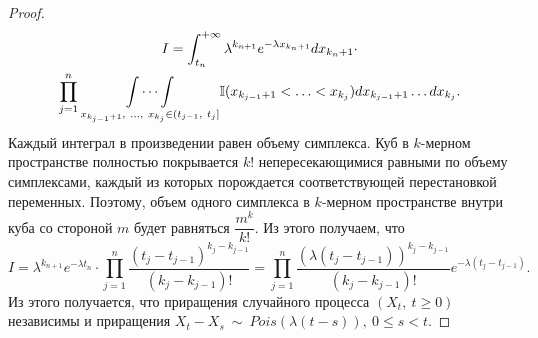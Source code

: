 \begin{proof}
\begin{gather*}
I=\int _{t_{n}}^{+\infty } \lambda ^{k_{n+1}} e^{-\lambda x_{k_{n} +1}} dx_{k_{n} +1} \cdotp \\
\prod _{j=1}^{n}\underset{{x_{k_{j-1} +1} ,\ \dotsc ,\ x_{k_{j}} \in ( t_{j-1} ,\ t_{j}]}}{\idotsint}\mathbb{I}( x_{k_{j-1} +1} < \dotsc < x_{k_{j}}) dx_{k_{j-1} +1} \dotsc dx_{k_{j}} .
\end{gather*}
Каждый интеграл в произведении равен объему симплекса. Куб в $\displaystyle k$-мерном пространстве полностью покрывается $\displaystyle k!$ непересекающимися равными по объему симплексами, каждый из которых порождается соответствующей перестановкой переменных. Поэтому, объем одного симплекса в $\displaystyle k$-мерном пространстве внутри куба со стороной $\displaystyle m$ будет равняться $\displaystyle \dfrac{m^{k}}{k!}$. Из этого получаем, что
\begin{equation*}
I=\lambda ^{k_{n+1}} e^{-\lambda t_{n}} \cdotp \prod _{j=1}^{n}\dfrac{( t_{j} -t_{j-1})^{k_{j} -k_{j-1}}}{( k_{j} -k_{j-1}) !} =\prod _{j=1}^{n}\dfrac{( \lambda ( t_{j} -t_{j-1}))^{k_{j} -k_{j-1}}}{( k_{j} -k_{j-1}) !} e^{-\lambda ( t_{j} -t_{j-1})} .
\end{equation*}
Из этого получается, что приращения случайного процесса $\displaystyle ( X_{t} ,\ t\geqslant 0)$ независимы и приращения $\displaystyle X_{t} -X_{s} \ \sim \ Pois( \lambda ( t-s)) ,\ 0\leqslant s< t$.
\end{proof}